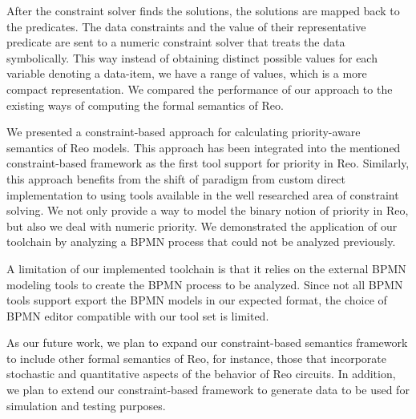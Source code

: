 After the constraint solver finds the solutions, the solutions are mapped back to the predicates. The data constraints and the value of their representative predicate are sent to a numeric constraint solver that treats the data symbolically. This way instead of obtaining distinct  possible values for each variable denoting a data-item, we have a range of values, which is a more compact representation. We compared the performance of our approach to the existing ways of computing the formal semantics of Reo.


We presented a constraint-based approach for calculating priority-aware semantics of Reo models. This approach has been integrated into the mentioned constraint-based framework as the first tool support for priority in Reo. Similarly, this approach benefits from the shift of paradigm from custom direct implementation to using tools available in the well researched area of constraint solving. We not only provide a way to model the binary notion of priority in Reo, but also we deal with numeric priority. We demonstrated the application of our toolchain by analyzing a BPMN process that could not be analyzed previously. 

A limitation of our implemented toolchain is that it relies on the external BPMN modeling tools to create the BPMN process to be analyzed. Since not all BPMN tools support export the BPMN models in our expected format, the choice of BPMN editor compatible with our tool set is limited. 

As our future work, we plan to expand our constraint-based semantics framework to include other formal semantics of Reo, for instance, those that incorporate stochastic and quantitative aspects of the behavior of Reo circuits. In addition, we plan to extend our constraint-based framework to generate data to be used for simulation and testing purposes.
